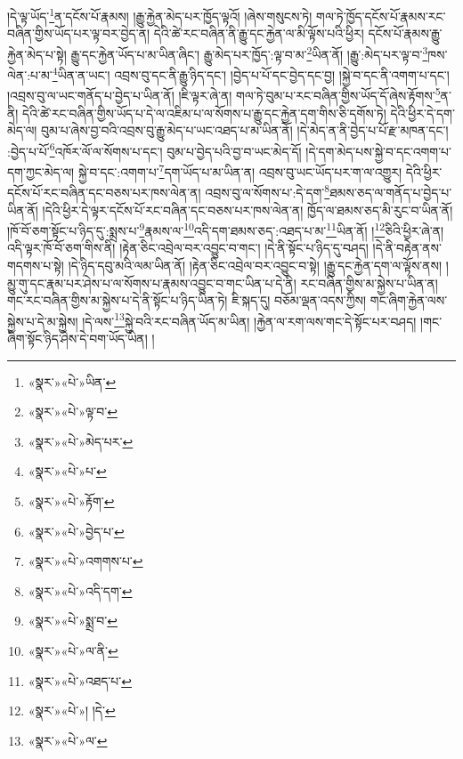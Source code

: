 །དེ་ལྟ་ཡོད་\footnote{«སྣར་»«པེ་»ཡིན་}ན་དངོས་པོ་རྣམས། །རྒྱུ་རྐྱེན་མེད་པར་ཁྱོད་ལྟའོ། །ཞེས་གསུངས་ཏེ། གལ་ཏེ་ཁྱོད་དངོས་པོ་རྣམས་རང་བཞིན་གྱིས་ཡོད་པར་ལྟ་བར་བྱེད་ན། དེའི་ཚེ་རང་བཞིན་ནི་རྒྱུ་དང་རྐྱེན་ལ་མི་ལྟོས་པའི་ཕྱིར། དངོས་པོ་རྣམས་རྒྱུ་རྐྱེན་མེད་པ་སྟེ། རྒྱུ་དང་རྐྱེན་ཡོད་པ་མ་ཡིན་ཞིང་། རྒྱུ་མེད་པར་ཁྱོད་:ལྟ་བ་མ་\footnote{«སྣར་»«པེ་»ལྟ་བ་}ཡིན་ནོ། །རྒྱུ་:མེད་པར་ལྟ་བ་\footnote{«སྣར་»«པེ་»མེད་པར་}ཁས་ལེན་:པ་མ་\footnote{«སྣར་»«པེ་»པ་}ཡིན་ན་ཡང་། འབྲས་བུ་དང་ནི་རྒྱུ་ཉིད་དང་། །བྱེད་པ་པོ་དང་བྱེད་དང་བྱ། །སྐྱེ་བ་དང་ནི་འགག་པ་དང་། །འབྲས་བུ་ལ་ཡང་གནོད་པ་བྱེད་པ་ཡིན་ནོ། །ཇི་ལྟར་ཞེ་ན། གལ་ཏེ་བུམ་པ་རང་བཞིན་གྱིས་ཡོད་དོ་ཞེས་རྟོགས་\footnote{«སྣར་»«པེ་»རྟོག་}ན་ནི། དེའི་ཚེ་རང་བཞིན་གྱིས་ཡོད་པ་དེ་ལ་འཇིམ་པ་ལ་སོགས་པ་རྒྱུ་དང་རྐྱེན་དག་གིས་ཅི་དགོས་ཏེ། དེའི་ཕྱིར་དེ་དག་མེད་ལ། བུམ་པ་ཞེས་བྱ་བའི་འབྲས་བུ་རྒྱུ་མེད་པ་ཡང་འཐད་པ་མ་ཡིན་ནོ། །དེ་མེད་ན་ནི་བྱེད་པ་པོ་རྫ་མཁན་དང་། :བྱེད་པ་པོ་\footnote{«སྣར་»«པེ་»བྱེད་པ་}འཁོར་ལོ་ལ་སོགས་པ་དང་། བུམ་པ་བྱེད་པའི་བྱ་བ་ཡང་མེད་དོ། །དེ་དག་མེད་པས་སྐྱེ་བ་དང་འགག་པ་དག་ཀྱང་མེད་ལ། སྐྱེ་བ་དང་:འགག་པ་\footnote{«སྣར་»«པེ་»འགགས་པ་}དག་ཡོད་པ་མ་ཡིན་ན། འབྲས་བུ་ཡང་ཡོད་པར་ག་ལ་འགྱུར། དེའི་ཕྱིར་དངོས་པོ་རང་བཞིན་དང་བཅས་པར་ཁས་ལེན་ན། འབྲས་བུ་ལ་སོགས་པ་:དེ་དག་\footnote{«སྣར་»«པེ་»འདི་དག་}ཐམས་ཅད་ལ་གནོད་པ་བྱེད་པ་ཡིན་ནོ། །དེའི་ཕྱིར་དེ་ལྟར་དངོས་པོ་རང་བཞིན་དང་བཅས་པར་ཁས་ལེན་ན། ཁྱོད་ལ་ཐམས་ཅད་མི་རུང་བ་ཡིན་ནོ། །ཁོ་བོ་ཅག་སྟོང་པ་ཉིད་དུ་:སྨྲས་པ་\footnote{«སྣར་»«པེ་»སྨྲ་བ་}རྣམས་ལ་\footnote{«སྣར་»«པེ་»ལ་ནི་}འདི་དག་ཐམས་ཅད་:འཐད་པ་མ་\footnote{«སྣར་»«པེ་»འཐད་པ་}ཡིན་ནོ། །\footnote{«སྣར་»«པེ་»། །དེ་}ཅིའི་ཕྱིར་ཞེ་ན། འདི་ལྟར་ཁོ་བོ་ཅག་གིས་ནི། །རྟེན་ཅིང་འབྲེལ་བར་འབྱུང་བ་གང་། །དེ་ནི་སྟོང་པ་ཉིད་དུ་བཤད། །དེ་ནི་བརྟེན་ནས་གདགས་པ་སྟེ། །དེ་ཉིད་དབུ་མའི་ལམ་ཡིན་ནོ། །རྟེན་ཅིང་འབྲེལ་བར་འབྱུང་བ་སྟེ། །རྒྱུ་དང་རྐྱེན་དག་ལ་ལྟོས་ནས། །མྱུ་གུ་དང་རྣམ་པར་ཤེས་པ་ལ་སོགས་པ་རྣམས་འབྱུང་བ་གང་ཡིན་པ་དེ་ནི། རང་བཞིན་གྱིས་མ་སྐྱེས་པ་ཡིན་ན། གང་རང་བཞིན་གྱིས་མ་སྐྱེས་པ་དེ་ནི་སྟོང་པ་ཉིད་ཡིན་ཏེ། ཇི་སྐད་དུ། བཅོམ་ལྡན་འདས་ཀྱིས། གང་ཞིག་རྐྱེན་ལས་སྐྱེས་པ་དེ་མ་སྐྱེས། །དེ་ལས་\footnote{«སྣར་»«པེ་»ལ་}སྐྱེ་བའི་རང་བཞིན་ཡོད་མ་ཡིན། །རྐྱེན་ལ་རག་ལས་གང་དེ་སྟོང་པར་བཤད། །གང་ཞིག་སྟོང་ཉིད་ཤེས་དེ་བག་ཡོད་ཡིན། །
